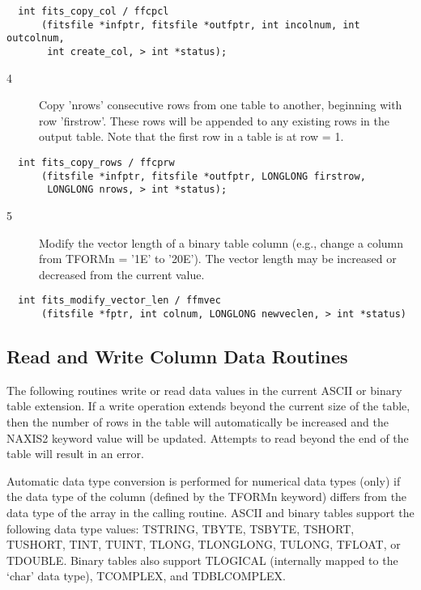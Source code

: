 \documentclass[11pt]{book}
\begin{document}
\begin{verbatim}
  int fits_copy_col / ffcpcl
      (fitsfile *infptr, fitsfile *outfptr, int incolnum, int outcolnum,
       int create_col, > int *status);
\end{verbatim}

\begin{description}
\item[4 ] Copy 'nrows' consecutive rows from one table to another, beginning
    with row 'firstrow'.  These rows will be appended to any existing
    rows in the output table.
   Note that the first row in a table is at row = 1. \label{ffcprw}
\end{description}

\begin{verbatim}
  int fits_copy_rows / ffcprw
      (fitsfile *infptr, fitsfile *outfptr, LONGLONG firstrow,
       LONGLONG nrows, > int *status);
\end{verbatim}

\begin{description}
\item[5 ] Modify the vector length of a binary table column (e.g.,
    change a column from TFORMn = '1E' to '20E').  The vector
   length may be increased or decreased from the current value. \label{ffmvec}
\end{description}

\begin{verbatim}
  int fits_modify_vector_len / ffmvec
      (fitsfile *fptr, int colnum, LONGLONG newveclen, > int *status)
\end{verbatim}

\subsection{Read and Write Column Data Routines}

The following routines write or read data values in the current ASCII
or binary table extension.  If a write operation extends beyond the
current size of the table, then the number of rows in the table will
automatically be increased and the NAXIS2 keyword value will be
updated.  Attempts to read beyond the end of the table will result in
an error.

Automatic data type conversion is performed for numerical data types
(only) if the data type of the column (defined by the TFORMn keyword)
differs from the data type of the array in the calling routine.  ASCII and binary
tables support the following data type values:  TSTRING, TBYTE, TSBYTE, TSHORT,
TUSHORT, TINT, TUINT, TLONG, TLONGLONG, TULONG, TFLOAT, or TDOUBLE.
Binary tables also support TLOGICAL (internally mapped to the `char'
data type), TCOMPLEX, and TDBLCOMPLEX.
\end{document}
